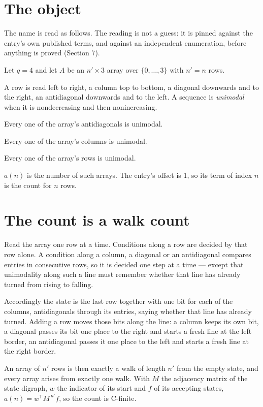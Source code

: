\documentclass[11pt]{article}
\theoremstyle{definition}
\begin{document}
\section{The object}

The name is read as follows. The reading is not a guess: it is pinned against the entry's own published terms, and against an independent enumeration, before anything is proved (Section 7).

Let $q = 4$ and let $A$ be an $n' \times 3$ array over $\{0,\dots,3\}$ with $n' = n$ rows.

A row is read left to right, a column top to bottom, a diagonal downwards and to the right, an antidiagonal downwards and to the left. A sequence is {\itshape unimodal} when it is nondecreasing and then nonincreasing.

Every one of the array's antidiagonals is unimodal.

Every one of the array's columns is unimodal.

Every one of the array's rows is unimodal.

$a(n)$ is the number of such arrays. The entry's offset is 1, so its term of index $n$ is the count for $n$ rows.

\section{The count is a walk count}

Read the array one row at a time. Conditions along a row are decided by that row alone. A condition along a column, a diagonal or an antidiagonal compares entries in consecutive rows, so it is decided one step at a time --- except that unimodality along such a line must remember whether that line has already turned from rising to falling.

Accordingly the state is the last row together with one bit for each of the columns, antidiagonals through its entries, saying whether that line has already turned. Adding a row moves those bits along the line: a column keeps its own bit, a diagonal passes its bit one place to the right and starts a fresh line at the left border, an antidiagonal passes it one place to the left and starts a fresh line at the right border.

An array of $n'$ rows is then exactly a walk of length $n'$ from the empty state, and every array arises from exactly one walk. With $M$ the adjacency matrix of the state digraph, $w$ the indicator of its start and $f$ of its accepting states, $a(n) = w^{\mathsf T}M^{\,n'}f$, so the count is C-finite.
\end{document}
